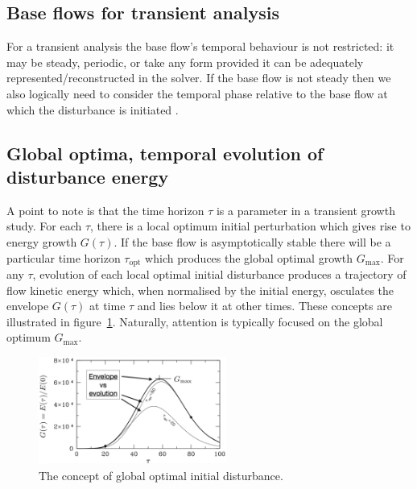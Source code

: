 \documentclass[11pt,a4paper]{report}
\begin{document}
\subsection{Base flows for transient analysis}
\label{sec.tgbase}

For a transient analysis the base flow's temporal behaviour is not
restricted: it may be steady, periodic, or take any form provided it
can be adequately represented/reconstructed in the solver. If the base
flow is not steady then we also logically need to consider the
temporal phase relative to the base flow at which the disturbance is
initiated \citep[see e.g.][]{bsb08}.

\subsection{Global optima, temporal evolution of disturbance energy}
\label{sec.envelope}

A point to note is that the time horizon $\tau$ is a parameter in a
transient growth study.  For each $\tau$, there is a local optimum
initial perturbation which gives rise to energy growth $G(\tau)$.  If
the base flow is asymptotically stable there will be a particular time
horizon $\tau_\textrm{opt}$ which produces the global optimal growth
$G_\textrm{max}$. For any $\tau$, evolution of each local optimal
initial disturbance produces a trajectory of flow kinetic energy
which, when normalised by the initial energy, osculates the envelope
$G(\tau)$ at time $\tau$ and lies below it at other times.  These
concepts are illustrated in figure~\ref{fig.eve}. Naturally, attention
is typically focused on the global optimum $G_\textrm{max}$.

\begin{figure}
\begin{center}
\includegraphics[width=0.55\textwidth]{EnvelopeVsEvolution}
\end{center}
\caption{The concept of global optimal initial disturbance.}
\label{fig.eve}
\end{figure}
\end{document}
